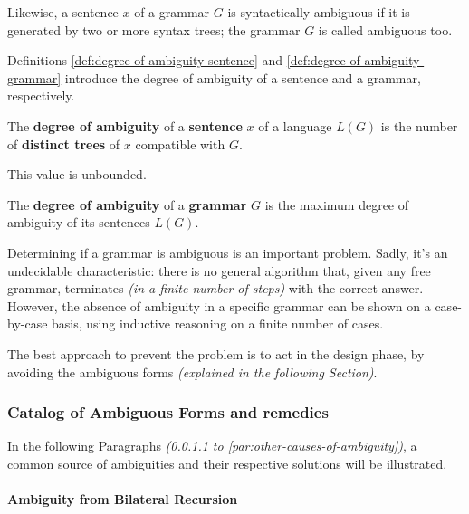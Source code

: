 \documentclass[english]{article}
\begin{document}
Likewise, a sentence \(x\) of a grammar \(G\) is syntactically ambiguous if it is generated by two or more syntax trees;
the grammar \(G\) is called ambiguous too.

Definitions \ref{def:degree-of-ambiguity-sentence} and \ref{def:degree-of-ambiguity-grammar} introduce the degree of ambiguity of a sentence and a grammar, respectively.

\begin{definition}
  \label{def:degree-of-ambiguity-sentence}
  The \textbf{degree of ambiguity} of a \textbf{sentence} \(x\) of a language \(L(G)\) is the number of \textbf{distinct trees} of \(x\) compatible with \(G\).

  This value is unbounded.
\end{definition}

\begin{definition}
  \label{def:degree-of-ambiguity-grammar}
  The \textbf{degree of ambiguity} of a \textbf{grammar} \(G\) is the maximum degree of ambiguity of its sentences \(L(G)\).
\end{definition}

\bigskip
Determining if a grammar is ambiguous is an important problem.
Sadly, it's an undecidable characteristic: there is no general algorithm that, given any free grammar, terminates \textit{(in a finite number of steps)} with the correct answer.
However, the absence of ambiguity in a specific grammar can be shown on a case-by-case basis, using inductive reasoning on a finite number of cases.

The best approach to prevent the problem is to act in the design phase, by avoiding the ambiguous forms \textit{(explained in the following Section)}.

\subsubsection{Catalog of Ambiguous Forms and remedies}

In the following Paragraphs \textit{(\ref{par:ambiguity-from-bilateral-recursion} to \ref{par:other-causes-of-ambiguity})}, a common source of ambiguities and their respective solutions will be illustrated.

\paragraph{Ambiguity from Bilateral Recursion}
\label{par:ambiguity-from-bilateral-recursion}
\end{document}
